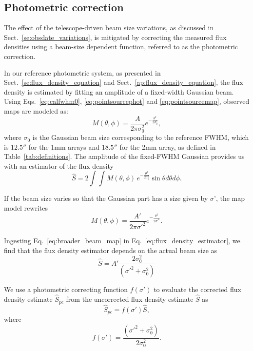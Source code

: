 \subsection{Photometric correction}

The effect of the telescope-driven beam size variations, as discussed
in Sect.~\ref{se:obsdate_variations}, is mitigated by correcting the measured flux
densities using a beam-size dependent function, referred to as the
photometric correction.


In our reference photometric system, as presented in
Sect.~\ref{se:flux_density_equation} and
Sect.~\ref{ap:flux_density_equation},
the flux density is estimated by fitting an amplitude of a fixed-width
Gaussian beam. Using Eqs.~\ref{eq:calfwhm0}, \ref{eq:pointsourcephot}
and \ref{eq:pointsourcemap}, observed maps are modeled as:
\begin{equation}
  M(\theta, \phi) = \frac{A}{2 \pi \sigma_{0}^{2}} e^{-\frac{\theta^{2}}{2\sigma_{0}^{2}}}, 
\end{equation}
where $\sigma_{0}$ is the Gaussian beam size corresponding to the
reference FWHM, which is $12.5''$ for the 1mm arrays and $18.5''$ for
the 2mm array, as defined in Table~\ref{tab:definitions}. The
amplitude of the fixed-FWHM Gaussian provides us with an estimator of
the flux density 
\begin{equation}
  \hat{S}  = 2 \int \int M(\theta, \phi)\, e^{-\frac{\theta^{2}}{2\sigma_{0}^{2}}} \sin \theta d\theta d\phi.
  \label{eq:flux_density_estimator}
\end{equation}

If the beam size varies so that the Gaussian part has a size given by
$\sigma ’$, the map model rewrites  
\begin{equation}
  M(\theta, \phi) = \frac{A'}{2 \pi \sigma'^{2}} e^{-\frac{\theta^{2}}{2\sigma'^{2}}}.
  \label{eq:broader_beam_map}
\end{equation}

Ingesting Eq.~\ref{eq:broader_beam_map} in
Eq.~\ref{eq:flux_density_estimator}, we find that the flux density
estimator depends on the actual beam size as
\begin{equation}
  \hat{S}  = A' \frac{2 \sigma_0^2}{(\sigma'^2 + \sigma_0^2)}
\end{equation}


We use a photometric correcting function $f(\sigma')$ to evaluate the corrected flux density estimate $\hat{S}_{pc}$ from the
uncorrected flux density estimate $\hat{S}$ as
\begin{equation}
  \hat{S}_{pc} = f(\sigma')\hat{S},
\end{equation} 
where
\begin{equation}
  f(\sigma') = \frac{(\sigma'^2 + \sigma_0^2)}{2 \sigma_0^2}. 
\end{equation} 



